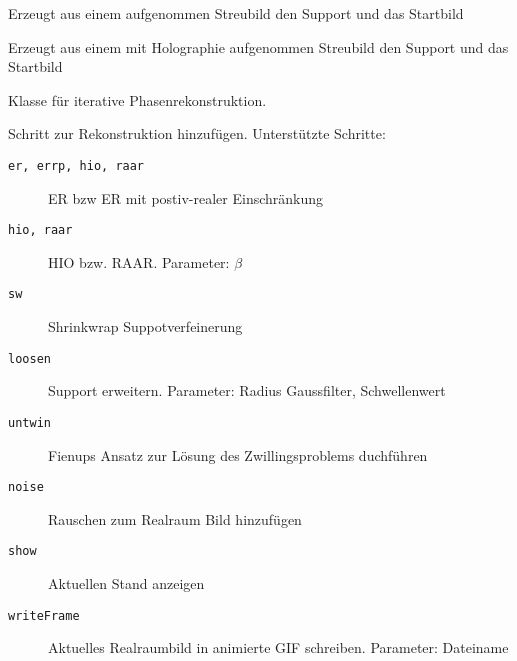 	
\begin{description}[style=nextline]
	
	\item [\texttt{\textit{[]}=SupportGeneric\textit{()}}]
		Erzeugt aus einem aufgenommen Streubild den Support und das Startbild
	
	\item [\texttt{\textit{[]}=SupportHolo\textit{()}}]
		Erzeugt aus einem mit Holographie aufgenommen Streubild den Support und das Startbild
	
	\item [\texttt{recon.Plan}] Klasse für iterative Phasenrekonstruktion. 
	\begin{description}[style=nextline]
		\item [\texttt{addStep\textit{(step,iterations,\{parameters\})}}]
		Schritt zur Rekonstruktion hinzufügen. Unterstützte Schritte:
		\begin{description}
			\item[\texttt{er, errp, hio, raar}] ER bzw ER mit postiv-realer Einschränkung
			\item[\texttt{hio, raar}] HIO bzw. RAAR. Parameter: $\beta$
			\item[\texttt{sw}] Shrinkwrap Suppotverfeinerung
			\item[\texttt{loosen}] Support erweitern. Parameter: Radius Gaussfilter, Schwellenwert
			\item[\texttt{untwin}] Fienups Ansatz zur Lösung des Zwillingsproblems duchführen
			\item[\texttt{noise}] Rauschen zum Realraum Bild hinzufügen
			\item[\texttt{show}] Aktuellen Stand anzeigen
			\item[\texttt{writeFrame}] Aktuelles Realraumbild in animierte GIF schreiben. Parameter: Dateiname
		\end{description}	
	\end{description}
\end{description}

\begin{comment}


Hilfmittel
	ft2
	ift2
	maskfilter
	pad2size
Simulation
	Erzeugun von Objekten
		
	-msft
	-multislice
	-thibault

Rekonstruktion
	-wiener
	-reconstruct
	SW
	holo\_support
	ERiter
	RAARiter
	HIOiter
	\end{comment}